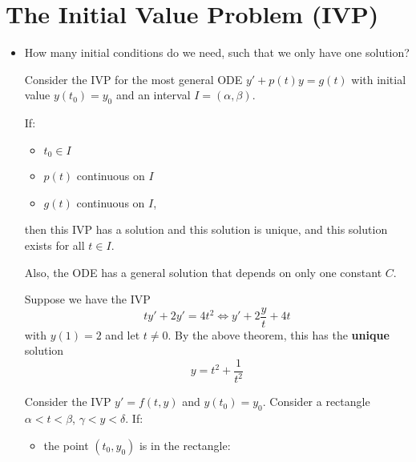 \section{The Initial Value Problem (IVP)}
\begin{itemize}
    \item How many initial conditions do we need, such that we only have one solution?
    \begin{theorem}
        Consider the IVP for the most general ODE $y'+p(t)y=g(t)$ with initial value $y(t_0)=y_0$ and an interval $I=(\alpha,\beta)$.
        \vspace{2mm}

        If: 
        \begin{itemize}
            \item $t_0 \in I$
            \item $p(t)$ continuous on $I$
            \item $g(t)$ continuous on $I$,
        \end{itemize}
        then this IVP has a solution and this solution is unique, and this solution exists for all $t\in I.$
        \vspace{2mm}

        Also, the ODE has a general solution that depends on only one constant $C$.
    \end{theorem}
    \begin{example}
        Suppose we have the IVP 
        \begin{equation}
            ty'+2y'=4t^2 \iff y'+2\frac{y}{t}+4t
        \end{equation}
        with $y(1)=2$ and let $t\neq 0.$ By the above theorem, this has the \textbf{unique} solution 
        \begin{equation}
            y = t^2 + \frac{1}{t^2}
        \end{equation}
    \end{example}
    \begin{theorem}
        Consider the IVP $y'=f(t,y)$ and $y(t_0)=y_0.$ Consider a rectangle $\alpha < t <\beta$, $\gamma < y < \delta$. If: 
        \begin{itemize}
            \item the point $(t_0,y_0)$ is in the rectangle: 
            \begin{center}
\end{center}
\end{itemize}
\end{theorem}
\end{itemize}
